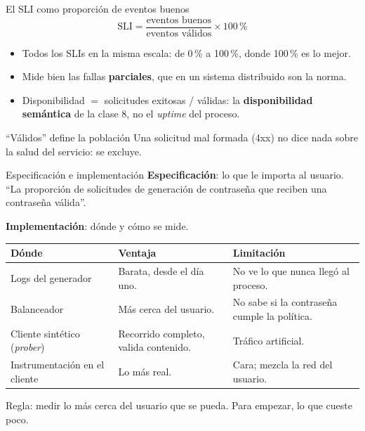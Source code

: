 \documentclass[institutional,screen,none]{ua-engineering-v6-beamer}
\begin{document}
\begin{frame}{El SLI como proporción de eventos buenos}
\[
\text{SLI} = \frac{\text{eventos buenos}}{\text{eventos válidos}} \times 100\,\%
\]

\begin{itemize}
\item Todos los SLIs en la misma escala: de 0\,\% a 100\,\%, donde 100\,\% es lo mejor.
\item Mide bien las fallas \textbf{parciales}, que en un sistema distribuido son la norma.
\item Disponibilidad $=$ solicitudes exitosas / válidas: la \textbf{disponibilidad semántica} de la clase 8, no el \emph{uptime} del proceso.
\end{itemize}

\pause

\begin{alertblock}{``Válidos'' define la población}
Una solicitud mal formada (4xx) no dice nada sobre la salud del servicio: se excluye.
\end{alertblock}
\end{frame}

\begin{frame}{Especificación e implementación}
\textbf{Especificación}: lo que le importa al usuario. ``La proporción de solicitudes de generación de contraseña que reciben una contraseña válida''.

\textbf{Implementación}: dónde y cómo se mide.

\pause

\begin{center}
\footnotesize
\begin{tabular}{p{}p{}p{}}
\toprule
\textbf{Dónde} & \textbf{Ventaja} & \textbf{Limitación} \\
\midrule
Logs del generador & Barata, desde el día uno. & No ve lo que nunca llegó al proceso. \\
Balanceador & Más cerca del usuario. & No sabe si la contraseña cumple la política. \\
Cliente sintético (\emph{prober}) & Recorrido completo, valida contenido. & Tráfico artificial. \\
Instrumentación en el cliente & Lo más real. & Cara; mezcla la red del usuario. \\
\bottomrule
\end{tabular}
\end{center}

{\small Regla: medir lo más cerca del usuario que se pueda. Para empezar, lo que cueste poco.}
\end{frame}
\end{document}
